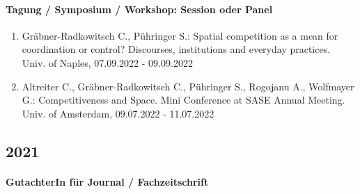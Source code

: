 \paragraph{Tagung / Symposium / Workshop: Session oder Panel}
\begin{enumerate}[leftmargin=*, labelsep=0.5cm]
\item Gräbner-Radkowitsch C., Pühringer S.: Spatial competition as a mean for coordination or control? Discourses, institutions and everyday practices. Univ. of Naples, 07.09.2022 - 09.09.2022
\item Altreiter C., Gräbner-Radkowitsch C., Pühringer S., Rogojanu A., Wolfmayer G.: Competitiveness and Space. Mini Conference at SASE Annual Meeting. Univ. of Amsterdam, 09.07.2022 - 11.07.2022
\end{enumerate}\subsection*{2021}\paragraph{GutachterIn für Journal / Fachzeitschrift}
